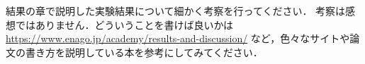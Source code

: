 結果の章で説明した実験結果について細かく考察を行ってください．
考察は感想ではありません．どういうことを書けば良いかは \url{https://www.enago.jp/academy/results-and-discussion/} など，色々なサイトや論文の書き方を説明している本を参考にしてみてください．